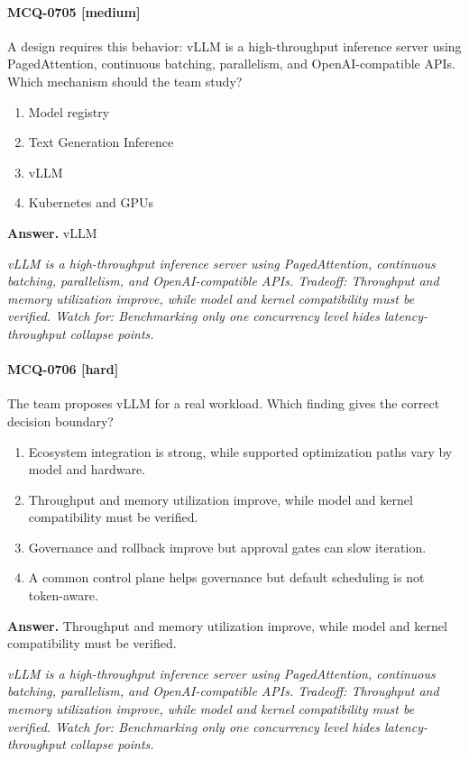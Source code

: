 \paragraph{MCQ-0705 [medium]} A design requires this behavior: vLLM is a high-throughput inference server using PagedAttention, continuous batching, parallelism, and OpenAI-compatible APIs. Which mechanism should the team study?
\begin{enumerate}[label=\Alph*.]
\item Model registry
\item Text Generation Inference
\item vLLM
\item Kubernetes and GPUs
\end{enumerate}
\noindent\textbf{Answer.} vLLM
\par\textit{vLLM is a high-throughput inference server using PagedAttention, continuous batching, parallelism, and OpenAI-compatible APIs. Tradeoff: Throughput and memory utilization improve, while model and kernel compatibility must be verified. Watch for: Benchmarking only one concurrency level hides latency-throughput collapse points.}
\paragraph{MCQ-0706 [hard]} The team proposes vLLM for a real workload. Which finding gives the correct decision boundary?
\begin{enumerate}[label=\Alph*.]
\item Ecosystem integration is strong, while supported optimization paths vary by model and hardware.
\item Throughput and memory utilization improve, while model and kernel compatibility must be verified.
\item Governance and rollback improve but approval gates can slow iteration.
\item A common control plane helps governance but default scheduling is not token-aware.
\end{enumerate}
\noindent\textbf{Answer.} Throughput and memory utilization improve, while model and kernel compatibility must be verified.
\par\textit{vLLM is a high-throughput inference server using PagedAttention, continuous batching, parallelism, and OpenAI-compatible APIs. Tradeoff: Throughput and memory utilization improve, while model and kernel compatibility must be verified. Watch for: Benchmarking only one concurrency level hides latency-throughput collapse points.}
